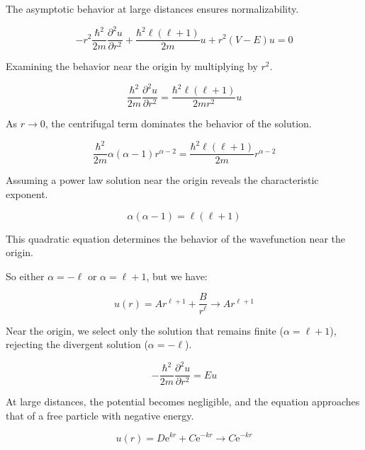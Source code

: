 \documentclass[italian]{HKNdocument}
\begin{document}
The asymptotic behavior at large distances ensures normalizability.

\begin{equation}
-r^{2} \frac{\hbar^{2}}{2 m} \frac{\partial^{2} u}{\partial r^{2}}+\frac{\hbar^{2} \ell(\ell+1)}{2 m} u+r^{2}(V-E) u=0 \label{eq:9.40}
\end{equation}

Examining the behavior near the origin by multiplying by $r^2$.

\begin{equation}
\frac{\hbar^{2}}{2 m} \frac{\partial^{2} u}{\partial r^{2}}=\frac{\hbar^{2} \ell(\ell+1)}{2 m r^{2}} u \label{eq:9.41}
\end{equation}

As $r \to 0$, the centrifugal term dominates the behavior of the solution.

\begin{equation}
\frac{\hbar^{2}}{2 m} \alpha(\alpha-1) r^{\alpha-2}=\frac{\hbar^{2} \ell(\ell+1)}{2 m} r^{\alpha-2} \label{eq:9.42}
\end{equation}

Assuming a power law solution near the origin reveals the characteristic exponent.

\begin{equation}
\alpha(\alpha-1)=\ell(\ell+1) \label{eq:9.43}
\end{equation}

This quadratic equation determines the behavior of the wavefunction near the origin.

So either $\alpha=-\ell$ or $\alpha=\ell+1$, but we have:

\begin{equation}
u(r)=A r^{\ell+1}+\frac{B}{r^{\ell}} \rightarrow A r^{\ell+1} \label{eq:9.44}
\end{equation}

Near the origin, we select only the solution that remains finite ($\alpha=\ell+1$), rejecting the divergent solution ($\alpha=-\ell$).

\begin{equation}
-\frac{\hbar^{2}}{2 m} \frac{\partial^{2} u}{\partial r^{2}}=E u \label{eq:9.45}
\end{equation}

At large distances, the potential becomes negligible, and the equation approaches that of a free particle with negative energy.

\begin{equation}
u(r)=D \mathrm{e}^{k r}+C \mathrm{e}^{-k r} \rightarrow C \mathrm{e}^{-k r} \label{eq:9.46}
\end{equation}
\end{document}
